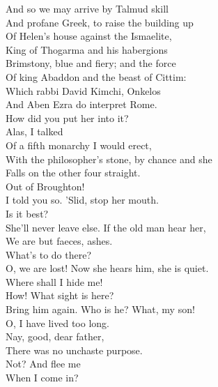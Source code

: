 \documentclass[a4paper,oneside,12pt]{memoir}
\begin{document}
\begin{drama*}
\dolspeaks And so we may arrive by Talmud skill\\
And profane Greek, to raise the building up\\
Of Helen's house against the Ismaelite,\\
King of Thogarma and his habergions\\
Brimstony, blue and fiery; and the force\\
Of king Abaddon and the beast of Cittim:\\
Which rabbi David Kimchi, Onkelos\\
And Aben Ezra do interpret Rome.\\
\facespeaks How did you put her into it?\\
\mammonspeaks {} Alas, I talked\\
Of a fifth monarchy I would erect,\\
With the philosopher's stone, by chance and she\\
Falls on the other four straight.\\
\facespeaks {} Out of Broughton!\\
I told you so. 'Slid, stop her mouth.\\
\mammonspeaks {} Is it best?\\
\facespeaks She'll never leave else. If the old man hear her,\\
We are but faeces, ashes.\\
\subtlespeaks {}  What's to do there?\\
\facespeaks O, we are lost! Now she hears him, she is quiet.\\
\mammonspeaks Where shall I hide me!\\
\subtlespeaks {} How! What sight is here?\\
Bring him again. Who is he? What, my son!\\
O, I have lived too long.\\
\mammonspeaks {} Nay, good, dear father,\\
There was no unchaste purpose.\\
\subtlespeaks {} Not? And flee me\\
When I come in?\\

\end{drama*}
\end{document}

